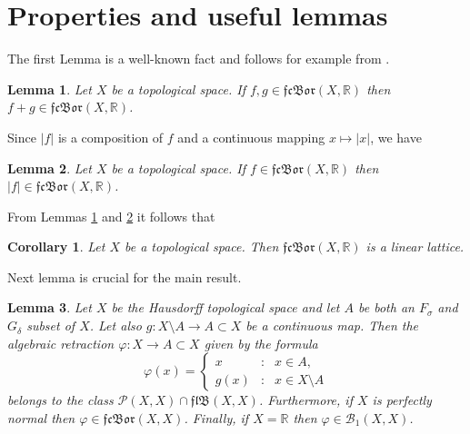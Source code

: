 \documentclass{amsart}
\newtheorem{Wn}{Corollary}
\newtheorem{Le}{Lemma}
\theoremstyle{definition}
\newcommand\mR{{\mathbb R}}
\newcommand\B{{\mathscr B}}
\newcommand\PC{{\mathscr{P}}}
\newcommand\cn{\colon}
\newcommand\fs{F_\sigma}
\newcommand\gd{G_\delta}
\newcommand\fcb{\mathfrak{fcBor}}
\newcommand\flb{\mathfrak{flB}}
\newcommand\fii{{\varphi}}
\begin{document}
\section{Properties and useful lemmas}
The first Lemma is a well-known fact and follows for example from \cite[Th. 2, Section VI of $\S$31]{Kur}.
\begin{Le}\label{suma_fcb}
Let $X$ be a topological space. If $f,g\in\fcb(X,\mR)$ then \\$f+g\in\fcb(X,\mR)$.
\end{Le}
Since $|f|$ is a composition of $f$ and a continuous mapping $x\mapsto|x|$, we have
\begin{Le}\label{modul_fcb}
Let $X$ be a topological space. If $f\in\fcb(X,\mR)$ then \\$|f|\in\fcb(X,\mR)$.
\end{Le}
From Lemmas \ref{suma_fcb} and \ref{modul_fcb} it follows that
\begin{Wn}\label{krata_liniowa}
Let $X$ be a topological space. Then $\fcb(X,\mR)$ is a linear lattice.
\end{Wn}
Next lemma is crucial for the main result.
\begin{Le}\label{funkcja fi}
Let $X$ be the Hausdorff topological space and let $A$ be both an $\fs$ and $\gd$ subset of $X$. Let also $g\cn X\setminus A\to A\subset X$
be a continuous map. Then the algebraic retraction $\varphi\cn X\to A\subset X$ given by the formula
\begin{equation}\label{fi}
\varphi(x)=\left\{\begin{array}{lll}
x & \textrm{:} & x\in A, \\
g(x) & \textrm{:} & x\in X\setminus A
\end{array} \right.
\end{equation}
belongs to the class $\PC(X,X)\cap\flb(X,X)$. Furthermore, if $X$ is perfectly normal then $\fii\in\fcb(X,X)$. Finally, if $X=\mR$ then
$\fii\in\B_1(X,X)$.
\end{Le}
\end{document}
